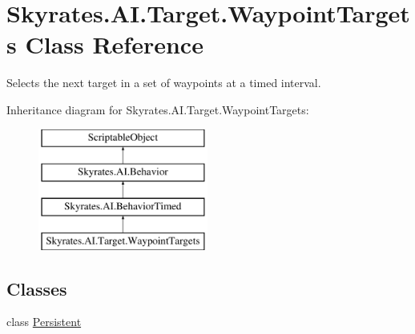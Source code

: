 \hypertarget{class_skyrates_1_1_a_i_1_1_target_1_1_waypoint_targets}{\section{Skyrates.\-A\-I.\-Target.\-Waypoint\-Targets Class Reference}
\label{class_skyrates_1_1_a_i_1_1_target_1_1_waypoint_targets}
}


Selects the next target in a set of waypoints at a timed interval.  


Inheritance diagram for Skyrates.\-A\-I.\-Target.\-Waypoint\-Targets\-:\begin{figure}[H]
\begin{center}
\leavevmode
\includegraphics[height=4.000000cm]{class_skyrates_1_1_a_i_1_1_target_1_1_waypoint_targets}
\end{center}
\end{figure}
\subsection*{Classes}
\begin{DoxyCompactItemize}
\item 
class \hyperlink{class_skyrates_1_1_a_i_1_1_target_1_1_waypoint_targets_1_1_persistent}{Persistent}
\end{DoxyCompactItemize}
